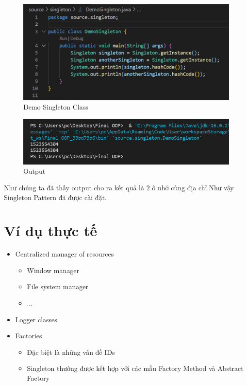 \begin{figure}[!htb]
    \centering
    \includegraphics[width=\textwidth]{fig/Singleton/demo_singleton_class.png}
    \caption{Demo Singleton Class}
    \label{fig:demo_singleton_class}
\end{figure}
\begin{figure}[!htb]
    \centering
    \includegraphics[width=\textwidth]{fig/Singleton/singleton_output.png}
    \caption{Output}
    \label{fig:singleton_output}
\end{figure}
\newpage
Như chúng ta đã thấy output cho ra kết quả là 2 ô nhớ cùng địa chỉ.Như vậy Singleton Pattern đã được cài đặt.

\section{Ví dụ thực tế}
\begin{itemize}
    \item Centralized manager of resources
    \begin{itemize}
        \item Window manager
        \item File system manager
        \item ...
    \end{itemize}
    \item Logger classes
    \item Factories
    \begin{itemize}
        \item Đặc biệt là những vấn đề  IDs
        \item Singleton thường được kết hợp với các mẫu Factory Method và Abstract Factory
    \end{itemize}
\end{itemize}

\newpage

